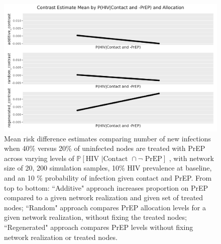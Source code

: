 \documentclass{article}
\theoremstyle{definition}
\begin{document}
\begin{figure}[H]
    \centering
    \includegraphics[width=\linewidth]{Corrected Figures/p1 Mean plots.png}
    \caption{Mean risk difference estimates comparing number of new infections when 40\% versus 20\% of uninfected nodes are treated with PrEP across varying levels of  $\mathbb{P}\left[\text{HIV } \vert \text {Contact } \cap \neg \text{ PrEP}\right]$ , with network size of 20,  200 simulation samples,  10\% HIV prevalence at baseline, and an 10 \% probability of infection given contact and PrEP.
    From top to bottom: ``Additive" approach increases proportion on PrEP compared to a given network realization and given set of treated nodes; ``Random" approach compares PrEP allocation levels for a given network realization, without fixing the treated nodes; ``Regenerated" approach compares PrEP levels without fixing network realization or treated nodes.}
    \label{fig:Figure 10}
\end{figure}
\end{document}
